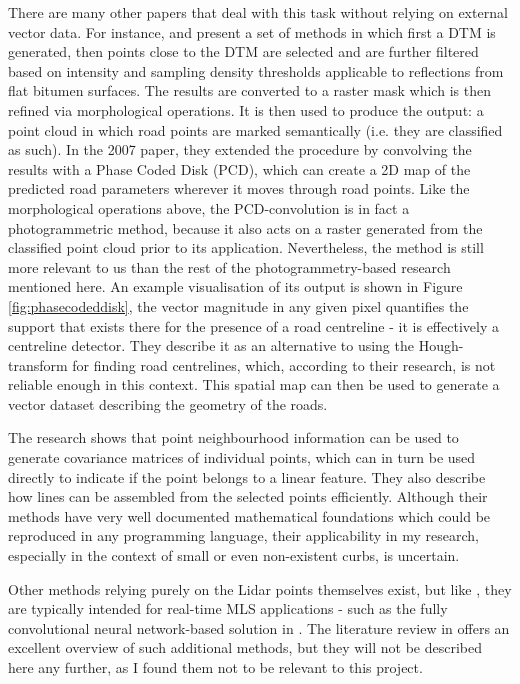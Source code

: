 There are many other papers that deal with this task without relying on external vector data. For instance, \cite{clode_etal_2004} and \cite{clode_etal_2007} present a set of methods in which first a DTM is generated, then points close to the DTM are selected and are further filtered based on intensity and sampling density thresholds applicable to reflections from flat bitumen surfaces. The results are converted to a raster mask which is then refined via morphological operations. It is then used to produce the output: a point cloud in which road points are marked semantically (i.e. they are classified as such). In the 2007 paper, they extended the procedure by convolving the results with a Phase Coded Disk (PCD), which can create a 2D map of the predicted road parameters wherever it moves through road points. Like the morphological operations above, the PCD-convolution is in fact a photogrammetric method, because it also acts on a raster generated from the classified point cloud prior to its application. Nevertheless, the method is still more relevant to us than the rest of the photogrammetry-based research mentioned here. An example visualisation of its output is shown in Figure \ref{fig:phasecodeddisk}, the vector magnitude in any given pixel quantifies the support that exists there for the presence of a road centreline - it is effectively a centreline detector. They describe it as an alternative to using the Hough-transform for finding road centrelines, which, according to their research, is not reliable enough in this context. This spatial map can then be used to generate a vector dataset describing the geometry of the roads.

The research \cite{gross_thoennessen_2006} shows that point neighbourhood information can be used to generate covariance matrices of individual points, which can in turn be used directly to indicate if the point belongs to a linear feature. They also describe how lines can be assembled from the selected points efficiently. Although their methods have very well documented mathematical foundations which could be reproduced in any programming language, their applicability in my research, especially in the context of small or even non-existent curbs, is uncertain.

Other methods relying purely on the Lidar points themselves exist, but like \cite{zhang_2010}, they are typically intended for real-time MLS applications - such as the fully convolutional neural network-based solution in \cite{caltagirone_etal_2017}. The literature review in \cite{yang_etal_2013} offers an excellent overview of such additional methods, but they will not be described here any further, as I found them not to be relevant to this project.

